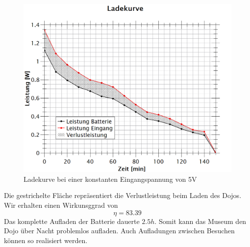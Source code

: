 \begin{figure}[h]
	\centering
	\includegraphics[width=\textwidth]{graphics/ladekurve.png}
	\caption{Ladekurve bei einer konstanten Eingangspannung von 5V}
	\label{fig:Ladeleistung}
\end{figure}

Die gestrichelte Fläche repräsentiert die Verlustleistung beim Laden des Dojos.
Wir erhalten einen Wirkunsggrad von
\begin{equation}
\eta = 83.39%
\end{equation}
Das komplette Aufladen der Batterie dauerte $2.5h$. Somit kann das Museum den Dojo über Nacht problemlos aufladen. Auch Aufladungen zwischen Besuchen können so realisiert werden.
